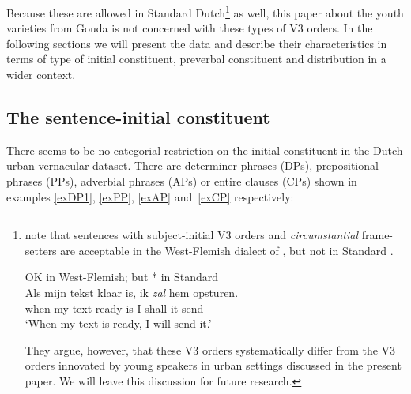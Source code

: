 \documentclass[output=paper]{langsci/langscibook}
\begin{document}
\noindent Because these are allowed in Standard
Dutch\footnote{\citet{GrecoHaegeman2020} note that sentences with
    subject-initial V3 orders and \emph{circumstantial} frame-setters are
    acceptable in the West-Flemish dialect of , but not in Standard .

\begin{exe}                   %
     OK in West-Flemish; but * in Standard \\
    \gll \llap{*}Als mijn tekst klaar is, ik \textit{zal} hem opsturen.\\
    when my text ready is I shall it send\\
    \trans \enquote*{When my text is ready, I will send it.}
\end{exe}                   %

They argue, however, that these V3 orders systematically differ from the V3
orders innovated by young  speakers in urban settings discussed in the
present paper. We will leave this discussion for future research.} as well,
this paper about the  youth varieties from Gouda is not concerned with
these types of V3 orders. In the following sections we will present the data
and describe their characteristics in terms of type of initial constituent,
preverbal constituent and distribution in a wider context.

\subsection{The sentence-initial constituent}
\label{sec:dataic}

There seems to be no categorial restriction on the initial constituent in the
Dutch urban vernacular dataset. There are determiner phrases (DPs),
prepositional phrases (PPs), adverbial phrases (APs) or entire clauses (CPs)
shown in examples \eqref{exDP1}, \eqref{exPP}, \eqref{exAP} and~\eqref{exCP}
respectively:
\end{document}
